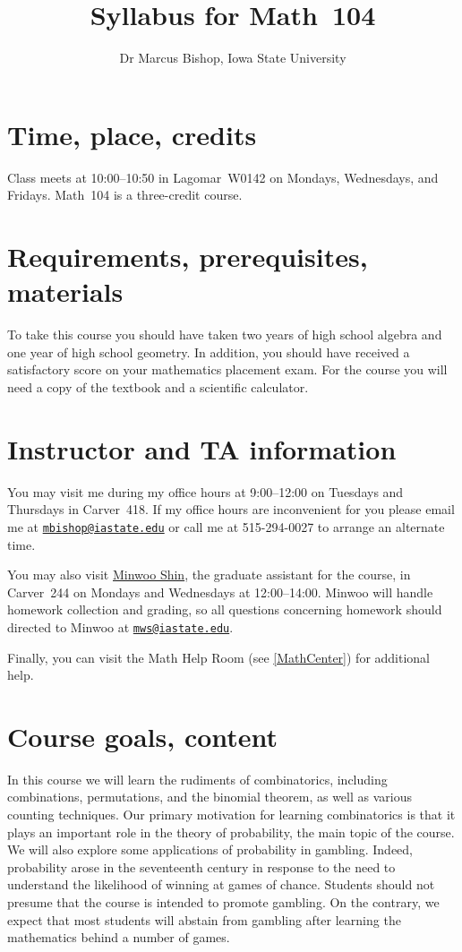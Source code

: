 \documentclass[11pt]{article}
\title{Syllabus for Math~104}
\author{Dr Marcus Bishop, Iowa State University}
\begin{document}
\maketitle

\section{Time, place, credits}\label{Time} Class meets at 10:00--10:50
in Lagomar~W0142 on Mondays, Wednesdays, and Fridays.
Math~104 is a three-credit course.

\section{Requirements, prerequisites, materials}
To take this course you should have taken two
years of high school algebra and one year of high school geometry.
In addition, you should
have received a satisfactory score on your mathematics placement exam.
For the course you will need a copy of the textbook
and a scientific calculator.

\section{Instructor and TA information} You may visit me during my office 
hours at 9:00--12:00 on Tuesdays and Thursdays
in Carver~418. If my office hours are inconvenient for you
please email me at 
\href{mailto:mbishop@iastate.edu}{\tt mbishop@iastate.edu} or call me at 
515-294-0027 to arrange an alternate time.

You may also visit
\href{mailto:mws@iastate.edu}{Minwoo Shin},
the graduate assistant for the course,
in Carver~244 on Mondays and Wednesdays at 12:00--14:00.
Minwoo will handle homework collection and grading, so all questions
concerning homework should directed to Minwoo at
\href{mailto:mws@iastate.edu}{\tt mws@iastate.edu}.

Finally, you can visit the Math Help Room (see \autoref{MathCenter})
for additional help.

\section{Course goals, content}
In this course we will learn the rudiments of combinatorics,
including combinations, permutations, and the binomial theorem,
as well as various counting techniques.
Our primary motivation for learning combinatorics is that it
plays an important role in the theory of probability, the main
topic of the course. We will also explore some
applications of probability in gambling. Indeed, probability
arose in the seventeenth century in response to the need
to understand the likelihood of winning at games of chance.
Students should not presume that the course is intended to
promote gambling. On the contrary, we expect that most
students will abstain from gambling after learning the mathematics
behind a number of games.
\end{document}
